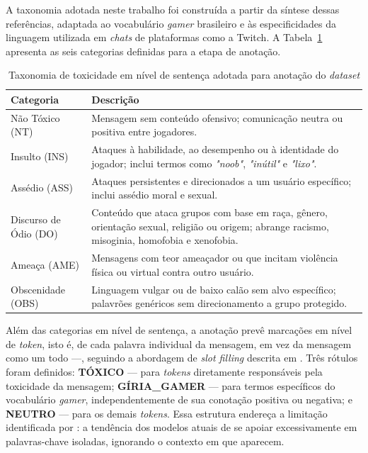 \documentclass{eic-bcc-tcc}
\begin{document}
A taxonomia adotada neste trabalho foi construída a partir da síntese dessas referências, adaptada ao vocabulário \textit{gamer} brasileiro e às especificidades da linguagem utilizada em \textit{chats} de plataformas como a Twitch. A Tabela~\ref{tab:taxonomia} apresenta as seis categorias definidas para a etapa de anotação.

\begin{table}[h!]
\centering
\small
\begin{tabular}{p{3.4cm}p{9cm}}
\hline
\textbf{Categoria} & \textbf{Descrição} \\ \hline
Não Tóxico (NT)       & Mensagem sem conteúdo ofensivo; comunicação neutra ou positiva entre jogadores. \\
Insulto (INS)         & Ataques à habilidade, ao desempenho ou à identidade do jogador; inclui termos como \textit{"noob"}, \textit{"inútil"} e \textit{"lixo"}. \\
Assédio (ASS)         & Ataques persistentes e direcionados a um usuário específico; inclui assédio moral e sexual. \\
Discurso de Ódio (DO) & Conteúdo que ataca grupos com base em raça, gênero, orientação sexual, religião ou origem; abrange racismo, misoginia, homofobia e xenofobia. \\
Ameaça (AME)          & Mensagens com teor ameaçador ou que incitam violência física ou virtual contra outro usuário. \\
Obscenidade (OBS)     & Linguagem vulgar ou de baixo calão sem alvo específico; palavrões genéricos sem direcionamento a grupo protegido. \\ \hline
\end{tabular}
\caption{Taxonomia de toxicidade em nível de sentença adotada para anotação do \textit{dataset}}
\label{tab:taxonomia}
\end{table}

Além das categorias em nível de sentença, a anotação prevê marcações em nível de \textit{token}, isto é, de cada palavra individual da mensagem, em vez da mensagem como um todo —, seguindo a abordagem de \textit{slot filling} descrita em \cite{naseem-etal-2025-gametox}. Três rótulos foram definidos: \textbf{TÓXICO} — para \textit{tokens} diretamente responsáveis pela toxicidade da mensagem; \textbf{GÍRIA\_GAMER} — para termos específicos do vocabulário \textit{gamer}, independentemente de sua conotação positiva ou negativa; e \textbf{NEUTRO} — para os demais \textit{tokens}. Essa estrutura endereça a limitação identificada por \cite{melo2025torna}: a tendência dos modelos atuais de se apoiar excessivamente em palavras-chave isoladas, ignorando o contexto em que aparecem.
\end{document}
